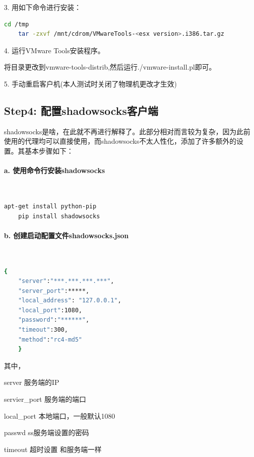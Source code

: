 \documentclass[UTF8, Microsoft YaHei]{book}
\begin{document}
    3. 用如下命令进行安装：

    \begin{lstlisting}[language=bash]
    cd /tmp
    tar -zxvf /mnt/cdrom/VMwareTools-<esx version>.i386.tar.gz
    \end{lstlisting}

    4. 运行VMware Tools安装程序。

        将目录更改到vmware-tools-distrib,然后运行./vmware-install.pl即可。

    5. 手动重启客户机(本人测试时关闭了物理机更改才生效)

    \subsection{Step4: 配置shadowsocks客户端}
    shadowsocks是啥，在此就不再进行解释了。此部分相对而言较为复杂，因为此前使用的代理均可以直接使用，而shadowsocks不太人性化，添加了许多额外的设置。其基本步骤如下：

    \paragraph{a. 使用命令行安装shadowsocks}

    ~

    \begin{lstlisting}[language=bash]
    apt-get install python-pip
    pip install shadowsocks
    \end{lstlisting}

    \paragraph{b. 创建启动配置文件shadowsocks.json}

    ~

    \begin{lstlisting}[language=bash]
    {
    "server":"***.***.***.***",
    "server_port":*****,
    "local_address": "127.0.0.1",
    "local_port":1080,
    "password":"******",
    "timeout":300,
    "method":"rc4-md5"
    }
    \end{lstlisting}

    其中，

    server 服务端的IP

    servier\_port 服务端的端口

    local\_port 本地端口，一般默认1080

    passwd ss服务端设置的密码

    timeout 超时设置 和服务端一样
\end{document}
